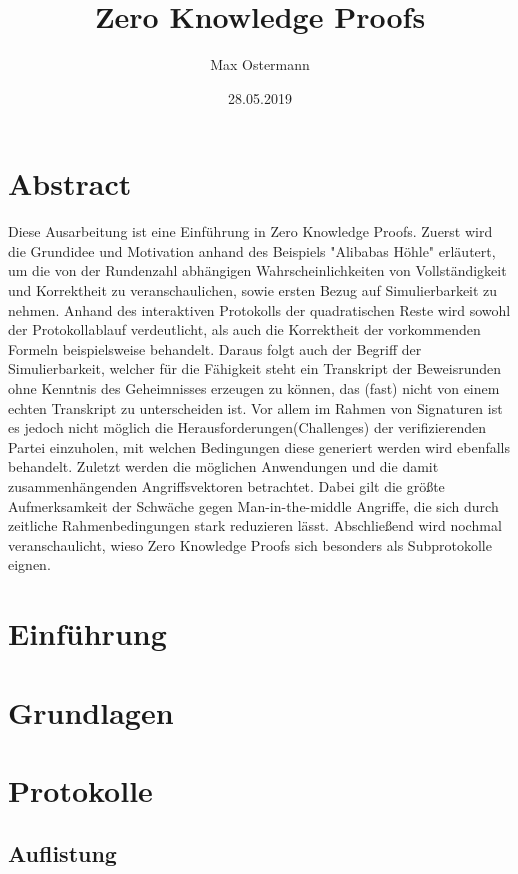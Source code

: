 \documentclass {article}
\title{Zero Knowledge Proofs}
\author{Max Ostermann}
\date{28.05.2019}
\begin{document}
\maketitle
{}
\newpage
{}

\section{Abstract}
Diese Ausarbeitung ist eine Einführung in Zero Knowledge Proofs.
Zuerst wird die Grundidee und Motivation anhand des Beispiels "Alibabas H\"ohle" erl\"autert, um die von der Rundenzahl abh\"angigen Wahrscheinlichkeiten von Vollst\"andigkeit und Korrektheit zu veranschaulichen, sowie ersten Bezug auf Simulierbarkeit zu nehmen. Anhand des interaktiven Protokolls der quadratischen Reste wird sowohl der Protokollablauf verdeutlicht, als auch die Korrektheit der vorkommenden Formeln beispielsweise behandelt. Daraus folgt auch der Begriff der Simulierbarkeit, welcher für die F\"ahigkeit steht ein Transkript der Beweisrunden ohne Kenntnis des Geheimnisses erzeugen zu können, das (fast) nicht von einem echten Transkript zu unterscheiden ist. Vor allem im Rahmen von Signaturen ist es jedoch nicht m\"oglich die Herausforderungen(Challenges) der verifizierenden Partei einzuholen, mit welchen Bedingungen diese generiert werden wird ebenfalls behandelt. 
Zuletzt werden die m\"oglichen Anwendungen und die damit zusammenh\"angenden Angriffsvektoren betrachtet. Dabei gilt die gr\"oßte Aufmerksamkeit der Schw\"ache gegen Man-in-the-middle Angriffe, die sich durch zeitliche Rahmenbedingungen stark reduzieren l\"asst. Abschlie\ss{}end wird nochmal veranschaulicht, wieso Zero Knowledge Proofs sich besonders als Subprotokolle eignen.


\newpage

\tableofcontents

\newpage 

\section{Einf\"uhrung}
\section{Grundlagen}
\section{Protokolle}
\subsection{Auflistung}
\end{document}
